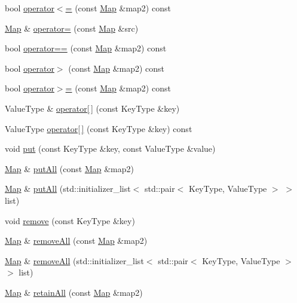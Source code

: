 \begin{DoxyCompactItemize}
\item 
bool \mbox{\hyperlink{classMap_a91d581dcc2a8ff2a83aa7854e9166dc9}{operator$<$=}} (const \mbox{\hyperlink{classMap}{Map}} \&map2) const
\item 
\mbox{\hyperlink{classMap}{Map}} \& \mbox{\hyperlink{classMap_a70c7b38b7d69581be6cbfe53ca06f725}{operator=}} (const \mbox{\hyperlink{classMap}{Map}} \&src)
\item 
bool \mbox{\hyperlink{classMap_a5dda0121a37510aec1dcf9cd53ba21e8}{operator==}} (const \mbox{\hyperlink{classMap}{Map}} \&map2) const
\item 
bool \mbox{\hyperlink{classMap_a991d18b9e2b2e21bd63f6fae462f56f6}{operator$>$}} (const \mbox{\hyperlink{classMap}{Map}} \&map2) const
\item 
bool \mbox{\hyperlink{classMap_a1e36cb0cc936dcb2be3362158099bc8e}{operator$>$=}} (const \mbox{\hyperlink{classMap}{Map}} \&map2) const
\item 
Value\+Type \& \mbox{\hyperlink{classMap_a5bd092d78b82b4818d17917816a59730}{operator\mbox{[}$\,$\mbox{]}}} (const Key\+Type \&key)
\item 
Value\+Type \mbox{\hyperlink{classMap_a9f52896b148cfbbc16e12ad1008971b1}{operator\mbox{[}$\,$\mbox{]}}} (const Key\+Type \&key) const
\item 
void \mbox{\hyperlink{classMap_af0d1d70a37332cb3054fe5b1b170927c}{put}} (const Key\+Type \&key, const Value\+Type \&value)
\item 
\mbox{\hyperlink{classMap}{Map}} \& \mbox{\hyperlink{classMap_aa8f04a9b5782a099d73bb66377d9c110}{put\+All}} (const \mbox{\hyperlink{classMap}{Map}} \&map2)
\item 
\mbox{\hyperlink{classMap}{Map}} \& \mbox{\hyperlink{classMap_a5703d038cf94b188b8a52c33b89944b5}{put\+All}} (std\+::initializer\+\_\+list$<$ std\+::pair$<$ Key\+Type, Value\+Type $>$ $>$ list)
\item 
void \mbox{\hyperlink{classMap_ac6e7e5198a9f1c8b2cc40fbd1d0eb3b0}{remove}} (const Key\+Type \&key)
\item 
\mbox{\hyperlink{classMap}{Map}} \& \mbox{\hyperlink{classMap_aef8a9fb79f29126a485f697c3069801c}{remove\+All}} (const \mbox{\hyperlink{classMap}{Map}} \&map2)
\item 
\mbox{\hyperlink{classMap}{Map}} \& \mbox{\hyperlink{classMap_a137a0bba581f8406f9859cf949536510}{remove\+All}} (std\+::initializer\+\_\+list$<$ std\+::pair$<$ Key\+Type, Value\+Type $>$ $>$ list)
\item 
\mbox{\hyperlink{classMap}{Map}} \& \mbox{\hyperlink{classMap_abe07b84e7c8050870da86c3d2005f3bb}{retain\+All}} (const \mbox{\hyperlink{classMap}{Map}} \&map2)

\end{DoxyCompactItemize}
